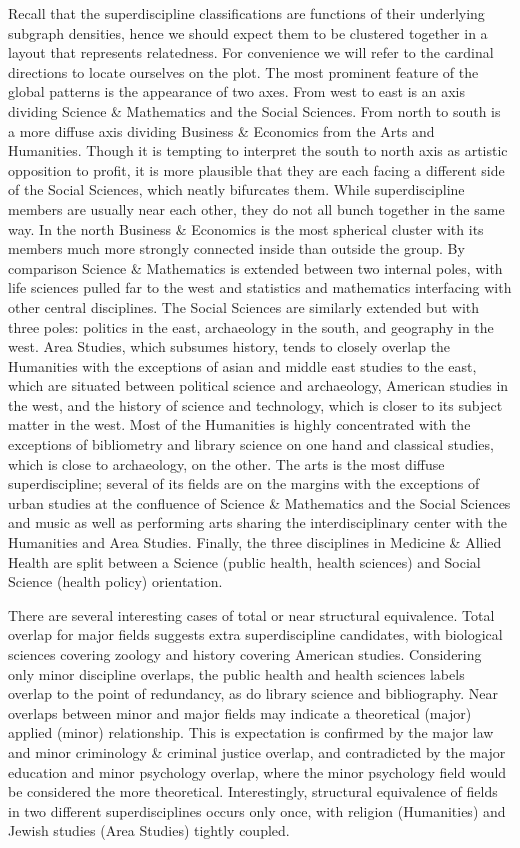 \documentclass[]{book}
\theoremstyle{definition}
\theoremstyle{definition}
\theoremstyle{definition}
\theoremstyle{remark}
\begin{document}
Recall that the superdiscipline classifications are functions of their
underlying subgraph densities, hence we should expect them to be
clustered together in a layout that represents relatedness. For
convenience we will refer to the cardinal directions to locate ourselves
on the plot. The most prominent feature of the global patterns is the
appearance of two axes. From west to east is an axis dividing Science \&
Mathematics and the Social Sciences. From north to south is a more
diffuse axis dividing Business \& Economics from the Arts and
Humanities. Though it is tempting to interpret the south to north axis
as artistic opposition to profit, it is more plausible that they are
each facing a different side of the Social Sciences, which neatly
bifurcates them. While superdiscipline members are usually near each
other, they do not all bunch together in the same way. In the north
Business \& Economics is the most spherical cluster with its members
much more strongly connected inside than outside the group. By
comparison Science \& Mathematics is extended between two internal
poles, with life sciences pulled far to the west and statistics and
mathematics interfacing with other central disciplines. The Social
Sciences are similarly extended but with three poles: politics in the
east, archaeology in the south, and geography in the west. Area Studies,
which subsumes history, tends to closely overlap the Humanities with the
exceptions of asian and middle east studies to the east, which are
situated between political science and archaeology, American studies in
the west, and the history of science and technology, which is closer to
its subject matter in the west. Most of the Humanities is highly
concentrated with the exceptions of bibliometry and library science on
one hand and classical studies, which is close to archaeology, on the
other. The arts is the most diffuse superdiscipline; several of its
fields are on the margins with the exceptions of urban studies at the
confluence of Science \& Mathematics and the Social Sciences and music
as well as performing arts sharing the interdisciplinary center with the
Humanities and Area Studies. Finally, the three disciplines in Medicine
\& Allied Health are split between a Science (public health, health
sciences) and Social Science (health policy) orientation.

There are several interesting cases of total or near structural
equivalence. Total overlap for major fields suggests extra
superdiscipline candidates, with biological sciences covering zoology
and history covering American studies. Considering only minor discipline
overlaps, the public health and health sciences labels overlap to the
point of redundancy, as do library science and bibliography. Near
overlaps between minor and major fields may indicate a theoretical
(major) applied (minor) relationship. This is expectation is confirmed
by the major law and minor criminology \& criminal justice overlap, and
contradicted by the major education and minor psychology overlap, where
the minor psychology field would be considered the more theoretical.
Interestingly, structural equivalence of fields in two different
superdisciplines occurs only once, with religion (Humanities) and Jewish
studies (Area Studies) tightly coupled.
\end{document}
